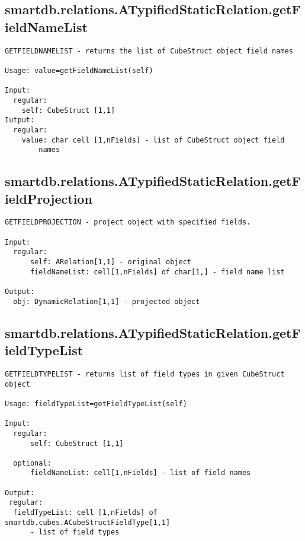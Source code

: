 \subsection{\texorpdfstring{smartdb.relations.ATypifiedStaticRelation.getFieldNameList}{getFieldNameList}}\label{method:smartdb.relations.ATypifiedStaticRelation.getFieldNameList}
\begin{verbatim}
GETFIELDNAMELIST - returns the list of CubeStruct object field names

Usage: value=getFieldNameList(self)

Input:
  regular:
    self: CubeStruct [1,1]
Iutput:
  regular:
    value: char cell [1,nFields] - list of CubeStruct object field
        names
\end{verbatim}
\subsection{\texorpdfstring{smartdb.relations.ATypifiedStaticRelation.getFieldProjection}{getFieldProjection}}\label{method:smartdb.relations.ATypifiedStaticRelation.getFieldProjection}
\begin{verbatim}
GETFIELDPROJECTION - project object with specified fields.

Input:
  regular:
      self: ARelation[1,1] - original object
      fieldNameList: cell[1,nFields] of char[1,] - field name list

Output:
  obj: DynamicRelation[1,1] - projected object
\end{verbatim}
\subsection{\texorpdfstring{smartdb.relations.ATypifiedStaticRelation.getFieldTypeList}{getFieldTypeList}}\label{method:smartdb.relations.ATypifiedStaticRelation.getFieldTypeList}
\begin{verbatim}
GETFIELDTYPELIST - returns list of field types in given CubeStruct object

Usage: fieldTypeList=getFieldTypeList(self)

Input:
  regular:
      self: CubeStruct [1,1]

  optional:
      fieldNameList: cell[1,nFields] - list of field names

Output:
 regular:
  fieldTypeList: cell [1,nFields] of smartdb.cubes.ACubeStructFieldType[1,1]
      - list of field types
\end{verbatim}
